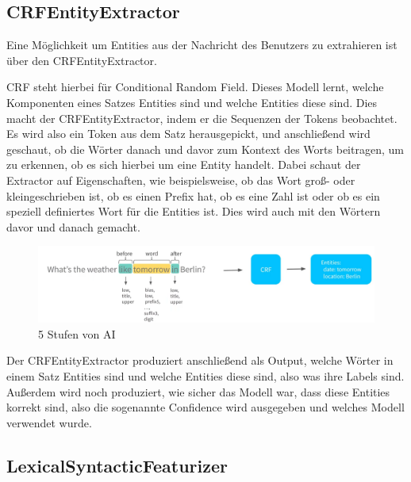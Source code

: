 \subsection{CRFEntityExtractor}

Eine Möglichkeit um Entities aus der Nachricht des Benutzers zu extrahieren ist über den CRFEntityExtractor.\cite{crfEntityExtractor}

CRF steht hierbei für Conditional Random Field.
Dieses Modell lernt, welche Komponenten eines Satzes Entities sind und welche Entities diese sind.\cite{crfEntityExtractor, pipelineComponentsYoutube, regexFeaturizerCrf}
\ci
Dies macht der CRFEntityExtractor, indem er die Sequenzen der Tokens beobachtet.
Es wird also ein Token aus dem Satz herausgepickt, und anschließend wird geschaut, ob die Wörter danach und davor zum Kontext des Worts beitragen, um zu erkennen, ob es sich hierbei um eine Entity handelt.
Dabei schaut der Extractor auf Eigenschaften, wie beispielsweise, ob das Wort groß- oder kleingeschrieben ist, ob es einen Prefix hat, ob es eine Zahl ist oder ob es ein speziell definiertes Wort für die Entities ist.
Dies wird auch mit den Wörtern davor und danach gemacht.\cite{crfEntityExtractor, pipelineComponentsYoutube, regexFeaturizerCrf}

\begin{figure}[hbt!]
  \centering
  \includegraphics[scale=0.25]{pics/crf-entity-extractor}
  \caption{5 Stufen von AI~\cite{pipelineComponentsYoutube}}
  \label{fig:CRFEntityExtractor}
\end{figure}

Der CRFEntityExtractor produziert anschließend als Output, welche Wörter in einem Satz Entities sind und welche Entities diese sind, also was ihre Labels sind.
Außerdem wird noch produziert, wie sicher das Modell war, dass diese Entities korrekt sind, also die sogenannte Confidence wird ausgegeben und welches Modell verwendet wurde.\cite{crfEntityExtractor, pipelineComponentsYoutube, regexFeaturizerCrf}

\subsection{LexicalSyntacticFeaturizer}

